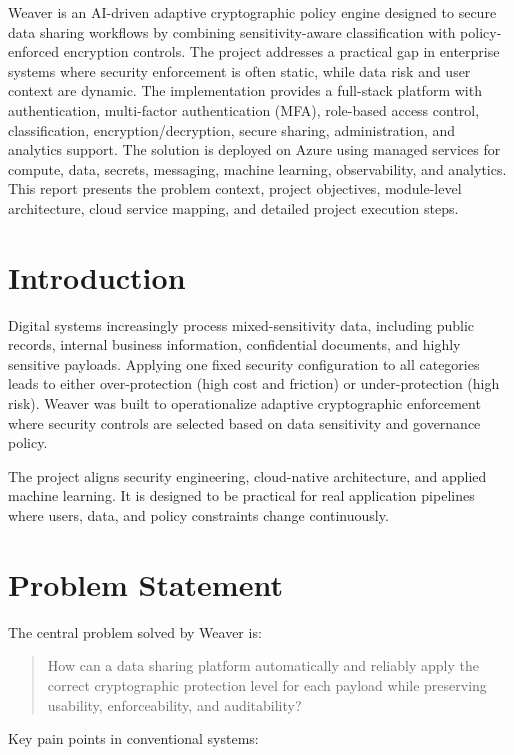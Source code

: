 \documentclass[12pt,a4paper]{article}
\begin{document}
Weaver is an AI-driven adaptive cryptographic policy engine designed to secure data sharing workflows by combining sensitivity-aware classification with policy-enforced encryption controls. The project addresses a practical gap in enterprise systems where security enforcement is often static, while data risk and user context are dynamic. The implementation provides a full-stack platform with authentication, multi-factor authentication (MFA), role-based access control, classification, encryption/decryption, secure sharing, administration, and analytics support. The solution is deployed on Azure using managed services for compute, data, secrets, messaging, machine learning, observability, and analytics. This report presents the problem context, project objectives, module-level architecture, cloud service mapping, and detailed project execution steps.

\section{Introduction}

Digital systems increasingly process mixed-sensitivity data, including public records, internal business information, confidential documents, and highly sensitive payloads. Applying one fixed security configuration to all categories leads to either over-protection (high cost and friction) or under-protection (high risk). Weaver was built to operationalize adaptive cryptographic enforcement where security controls are selected based on data sensitivity and governance policy.

The project aligns security engineering, cloud-native architecture, and applied machine learning. It is designed to be practical for real application pipelines where users, data, and policy constraints change continuously.

\section{Problem Statement}

The central problem solved by Weaver is:

\begin{quote}
How can a data sharing platform automatically and reliably apply the correct cryptographic protection level for each payload while preserving usability, enforceability, and auditability?
\end{quote}

Key pain points in conventional systems:
\end{document}
